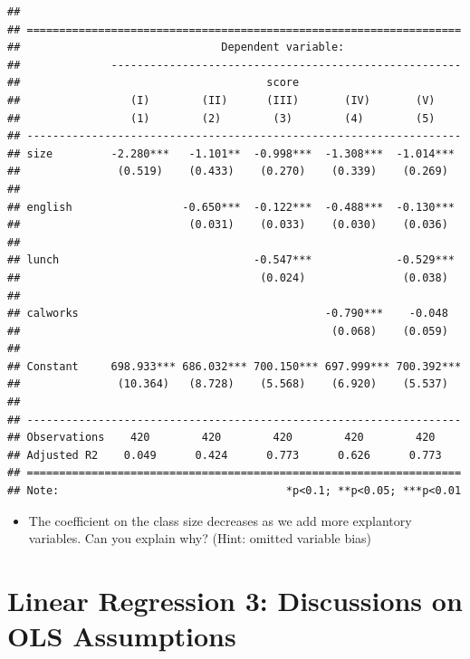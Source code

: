 \documentclass[]{book}
\providecommand{\tightlist}{%
  \setlength{\itemsep}{0pt}\setlength{\parskip}{0pt}}
\begin{document}
\begin{verbatim}
## 
## ===================================================================
##                               Dependent variable:                  
##              ------------------------------------------------------
##                                      score                         
##                 (I)        (II)      (III)       (IV)       (V)    
##                 (1)        (2)        (3)        (4)        (5)    
## -------------------------------------------------------------------
## size         -2.280***   -1.101**  -0.998***  -1.308***  -1.014*** 
##               (0.519)    (0.433)    (0.270)    (0.339)    (0.269)  
##                                                                    
## english                 -0.650***  -0.122***  -0.488***  -0.130*** 
##                          (0.031)    (0.033)    (0.030)    (0.036)  
##                                                                    
## lunch                              -0.547***             -0.529*** 
##                                     (0.024)               (0.038)  
##                                                                    
## calworks                                      -0.790***    -0.048  
##                                                (0.068)    (0.059)  
##                                                                    
## Constant     698.933*** 686.032*** 700.150*** 697.999*** 700.392***
##               (10.364)   (8.728)    (5.568)    (6.920)    (5.537)  
##                                                                    
## -------------------------------------------------------------------
## Observations    420        420        420        420        420    
## Adjusted R2    0.049      0.424      0.773      0.626      0.773   
## ===================================================================
## Note:                                   *p<0.1; **p<0.05; ***p<0.01
\end{verbatim}

\begin{itemize}
\tightlist
\item
  The coefficient on the class size decreases as we add more explantory
  variables. Can you explain why? (Hint: omitted variable bias)
\end{itemize}

\chapter{Linear Regression 3: Discussions on OLS
Assumptions}\label{linear-regression-3-discussions-on-ols-assumptions}
\end{document}
